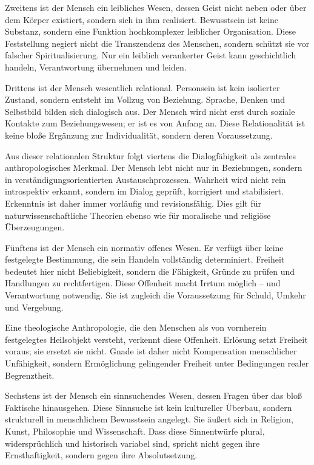 \documentclass[
  ngerman,
]{article}
\begin{document}
Zweitens ist der Mensch ein leibliches Wesen, dessen Geist nicht neben
oder über dem Körper existiert, sondern sich in ihm realisiert.
Bewusstsein ist keine Substanz, sondern eine Funktion hochkomplexer
leiblicher Organisation. Diese Feststellung negiert nicht die
Transzendenz des Menschen, sondern schützt sie vor falscher
Spiritualisierung. Nur ein leiblich verankerter Geist kann geschichtlich
handeln, Verantwortung übernehmen und leiden.

Drittens ist der Mensch wesentlich relational. Personsein ist kein
isolierter Zustand, sondern entsteht im Vollzug von Beziehung. Sprache,
Denken und Selbstbild bilden sich dialogisch aus. Der Mensch wird nicht
erst durch soziale Kontakte zum Beziehungswesen; er ist es von Anfang
an. Diese Relationalität ist keine bloße Ergänzung zur Individualität,
sondern deren Voraussetzung.

Aus dieser relationalen Struktur folgt viertens die Dialogfähigkeit als
zentrales anthropologisches Merkmal. Der Mensch lebt nicht nur in
Beziehungen, sondern in verständigungsorientierten Austauschprozessen.
Wahrheit wird nicht rein introspektiv erkannt, sondern im Dialog
geprüft, korrigiert und stabilisiert. Erkenntnis ist daher immer
vorläufig und revisionsfähig. Dies gilt für naturwissenschaftliche
Theorien ebenso wie für moralische und religiöse Überzeugungen.

Fünftens ist der Mensch ein normativ offenes Wesen. Er verfügt über
keine festgelegte Bestimmung, die sein Handeln vollständig determiniert.
Freiheit bedeutet hier nicht Beliebigkeit, sondern die Fähigkeit, Gründe
zu prüfen und Handlungen zu rechtfertigen. Diese Offenheit macht Irrtum
möglich -- und Verantwortung notwendig. Sie ist zugleich die
Voraussetzung für Schuld, Umkehr und Vergebung.

Eine theologische Anthropologie, die den Menschen als von vornherein
festgelegtes Heilsobjekt versteht, verkennt diese Offenheit. Erlösung
setzt Freiheit voraus; sie ersetzt sie nicht. Gnade ist daher nicht
Kompensation menschlicher Unfähigkeit, sondern Ermöglichung gelingender
Freiheit unter Bedingungen realer Begrenztheit.

Sechstens ist der Mensch ein sinnsuchendes Wesen, dessen Fragen über das
bloß Faktische hinausgehen. Diese Sinnsuche ist kein kultureller
Überbau, sondern strukturell in menschlichem Bewusstsein angelegt. Sie
äußert sich in Religion, Kunst, Philosophie und Wissenschaft. Dass diese
Sinnentwürfe plural, widersprüchlich und historisch variabel sind,
spricht nicht gegen ihre Ernsthaftigkeit, sondern gegen ihre
Absolutsetzung.
\end{document}
